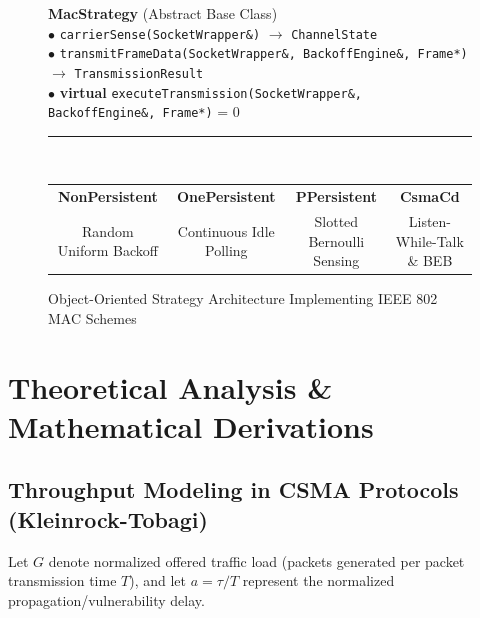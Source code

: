 \documentclass[11pt,a4paper]{article}
\begin{document}
\begin{figure}[htbp]
\centering
\begin{tcolorbox}[colback=softblue!20, colframe=navyblue, boxrule=0.8pt, width=0.95\textwidth, arc=1.5mm, title=\textbf{Strategy Pattern Class Hierarchy}]
\centering
\small\sffamily
\textbf{MacStrategy} (Abstract Base Class)\\
\footnotesize
$\bullet$ \texttt{carrierSense(SocketWrapper\&)} $\rightarrow$ \texttt{ChannelState}\\
$\bullet$ \texttt{transmitFrameData(SocketWrapper\&, BackoffEngine\&, Frame*)} $\rightarrow$ \texttt{TransmissionResult}\\
$\bullet$ \textbf{virtual} \texttt{executeTransmission(SocketWrapper\&, BackoffEngine\&, Frame*)} = 0\\
\vspace{0.2cm}
\rule{0.8\textwidth}{0.5pt}\\
\vspace{0.2cm}
\begin{tabular}{c c c c}
\textbf{NonPersistent} & \textbf{OnePersistent} & \textbf{PPersistent} & \textbf{CsmaCd} \\
\scriptsize Random Uniform Backoff & \scriptsize Continuous Idle Polling & \scriptsize Slotted Bernoulli Sensing & \scriptsize Listen-While-Talk \& BEB \\
\end{tabular}
\end{tcolorbox}
\caption{Object-Oriented Strategy Architecture Implementing IEEE 802 MAC Schemes}
\label{fig:strategy_design}
\end{figure}

\section{Theoretical Analysis \& Mathematical Derivations}

\subsection{Throughput Modeling in CSMA Protocols (Kleinrock-Tobagi)}
Let $G$ denote normalized offered traffic load (packets generated per packet transmission time $T$), and let $a = \tau / T$ represent the normalized propagation/vulnerability delay.
\end{document}
